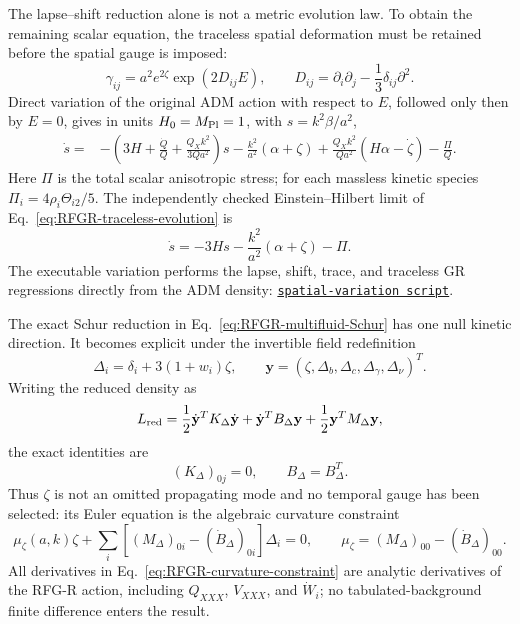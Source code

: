 \documentclass[11pt,a4paper]{article}
\newcommand{\RFGRepoURL}{https://github.com/MartinPetrasek123/MartinPetrasek123}
\newcommand{\RFGRepoNamed}[2]{\href{\RFGRepoURL/blob/main/r-universe-complete-chain/rfg-r-completion/r\_universe\_completion/#1}{\texttt{#2}}}
\begin{document}
The lapse--shift reduction alone is not a metric evolution law. To obtain the
remaining scalar equation, the traceless spatial deformation must be retained
before the spatial gauge is imposed:
\begin{equation}
 \gamma_{ij}=a^2e^{2\zeta}\exp(2D_{ij}E),\qquad
 D_{ij}=\partial_i\partial_j-\frac13\delta_{ij}\partial^2 .
 \label{eq:RFGR-traceless-metric}
\end{equation}
Direct variation of the original ADM action with respect to \(E\), followed
only then by \(E=0\), gives in units \(H_0=M_{\rm Pl}=1\), with
\(s=k^2\beta/a^2\),
\begin{align}
 \dot s={}&-\left(3H+\frac{\dot Q}{Q}
 +\frac{Q_Xk^2}{3Qa^2}\right)s
 -\frac{k^2}{a^2}(\alpha+\zeta)
 +\frac{Q_Xk^2}{Qa^2}(H\alpha-\dot\zeta)
 -\frac{\Pi}{Q} .
 \label{eq:RFGR-traceless-evolution}
\end{align}
Here \(\Pi\) is the total scalar anisotropic stress; for each massless
kinetic species \(\Pi_i=4\rho_i\Theta_{i2}/5\). The independently checked
Einstein--Hilbert limit of Eq.~\eqref{eq:RFGR-traceless-evolution} is
\begin{equation}
 \dot s=-3Hs-\frac{k^2}{a^2}(\alpha+\zeta)-\Pi .
 \label{eq:RFGR-traceless-GR}
\end{equation}
The executable variation performs the lapse, shift, trace, and traceless GR
regressions directly from the ADM density:
\RFGRepoNamed{scripts/derive\_spatial\_traceless\_equation.py}{spatial-variation script}.

The exact Schur reduction in Eq.~\eqref{eq:RFGR-multifluid-Schur} has one
null kinetic direction. It becomes explicit under the invertible field
redefinition
\begin{equation}
 \Delta_i=\delta_i+3(1+w_i)\zeta,
 \qquad
 \mathbf y=(\zeta,\Delta_b,\Delta_c,\Delta_\gamma,\Delta_\nu)^T.
 \label{eq:RFGR-Delta-definition}
\end{equation}
Writing the reduced density as
\begin{equation}
 L_{\rm red}=\frac12\dot{\mathbf y}^{T}K_\Delta\dot{\mathbf y}
 +\dot{\mathbf y}^{T}B_\Delta\mathbf y
 +\frac12\mathbf y^TM_\Delta\mathbf y,
 \label{eq:RFGR-DAE-density}
\end{equation}
the exact identities are
\begin{equation}
 (K_\Delta)_{0j}=0,\qquad B_\Delta=B_\Delta^T.
 \label{eq:RFGR-DAE-identities}
\end{equation}
Thus \(\zeta\) is not an omitted propagating mode and no temporal gauge has
been selected: its Euler equation is the algebraic curvature constraint
\begin{equation}
 \mu_\zeta(a,k)\zeta+
 \sum_i\left[(M_\Delta)_{0i}-(\dot B_\Delta)_{0i}\right]\Delta_i=0,
 \qquad
 \mu_\zeta=(M_\Delta)_{00}-(\dot B_\Delta)_{00}.
 \label{eq:RFGR-curvature-constraint}
\end{equation}
All derivatives in Eq.~\eqref{eq:RFGR-curvature-constraint} are analytic
derivatives of the RFG-R action, including \(Q_{XXX}\), \(V_{XXX}\), and
\(\dot W_i\); no tabulated-background finite difference enters the result.
\end{document}
